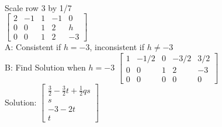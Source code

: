 \documentclass{article}
\begin{document}
\\[0.05in]Scale row 3 by 1/7\\[0.05in]
$\left[\begin{array}{cccc|c}
2 & -1 & 1 & -1 & 0 \\
0 & 0 & 1 & 2 & h \\
0 & 0 & 1 & 2 & -3
\end{array}\right]$\\[0.05in]
A: Consistent if $h=-3$, inconsistent if $h\neq -3$\\
B: Find Solution when $h=-3$
$\left[\begin{array}{cccc|c}
1 & -1/2 & 0 & -3/2 & 3/2 \\
0 & 0 & 1 & 2 & -3 \\
0 & 0 & 0 & 0 & 0
\end{array}\right]$
\\[0.1in]Solution:
$\left[\begin{array}{c}
\frac{3}{2}-\frac{3}{2}t+\frac{1}{2}qs \\
s \\
-3-2t \\
t
\end{array}\right]$
\end{document}
